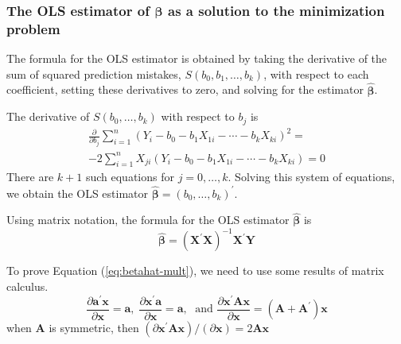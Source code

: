 \documentclass[a4paper,11pt]{article}
\begin{document}
\subsubsection*{The OLS estimator of \(\boldsymbol{\beta}\) as a solution to the minimization problem}
\label{sec:org9034f3a}
The formula for the OLS estimator is obtained by taking the derivative
of the sum of squared prediction mistakes, \(S(b_0, b_1, \ldots, b_k)\), with respect to each coefficient,
setting these derivatives to zero, and solving for the estimator
\(\hat{\boldsymbol{\beta}}\).

The derivative of \(S(b_0, \ldots, b_k)\) with respect to \(b_j\) is
\begin{gather*}
\label{eq:ols-wrt-bj}
\frac{\partial }{\partial b_j} \sum_{i=1}^n \left(Y_i - b_0 - b_1 X_{1i} - \cdots - b_k X_{ki} \right)^2 = \\
-2 \sum_{i=1}^n X_{ji} \left(Y_i - b_0 - b_1 X_{1i} - \cdots - b_k X_{ki} \right) = 0
\end{gather*}
There are \(k+1\) such equations for \(j=0, \ldots, k\). Solving this
system of equations, we obtain the OLS estimator
\(\hat{\boldsymbol{\beta}} = (b_0, \ldots, b_k)^{\prime}\).

Using matrix notation, the formula for the OLS estimator
\(\boldsymbol{\hat{\beta}}\) is
\begin{equation}
\label{eq:betahat-mult}
\boldsymbol{\hat{\beta}} = (\mathbf{X}^{\prime} \mathbf{X})^{-1} \mathbf{X}^{\prime} \mathbf{Y}
\end{equation}

To prove Equation (\ref{eq:betahat-mult}), we need to use some results
of matrix calculus.
\begin{equation}
\label{eq:matrix-calc}
\frac{\partial \mathbf{a}^{\prime} \mathbf{x}}{\partial \mathbf{x}} = \mathbf{a},\; \frac{\partial \mathbf{x}^{\prime} \mathbf{a}}{\partial \mathbf{x}} = \mathbf{a},\; \text{ and } \frac{\partial \mathbf{x}^{\prime} \mathbf{A} \mathbf{x}}{\partial \mathbf{x}} = (\mathbf{A} + \mathbf{A}^{\prime}) \mathbf{x}
\end{equation}
when \(\mathbf{A}\) is symmetric, then \((\partial \mathbf{x}^{\prime} \mathbf{A} \mathbf{x}) / (\partial \mathbf{x}) = 2\mathbf{A} \mathbf{x}\)
\end{document}
